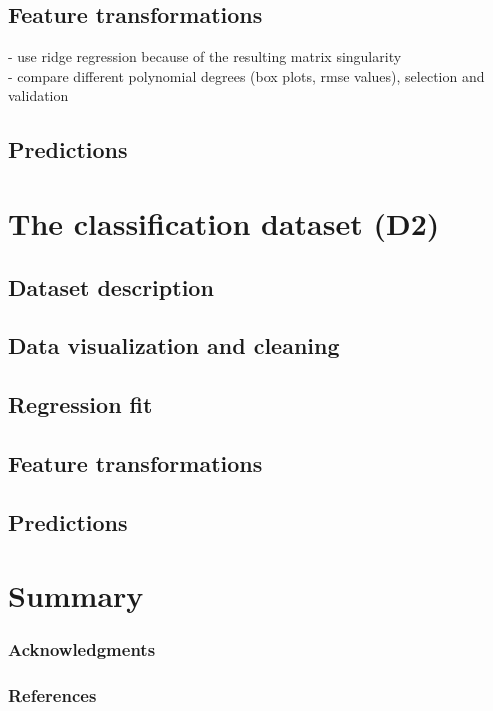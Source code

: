 \documentclass{article} %
\begin{document}
  \subsection{Feature transformations}
    - use ridge regression because of the resulting matrix singularity\\
    - compare different polynomial degrees (box plots, rmse values), selection and validation

  \subsection{Predictions}



\section{The classification dataset (D2)}

  \subsection{Dataset description}

  \subsection{Data visualization and cleaning}

  \subsection{Regression fit}

  \subsection{Feature transformations}

  \subsection{Predictions}



\section{Summary}

\subsubsection*{Acknowledgments}

\subsubsection*{References}
\end{document}
